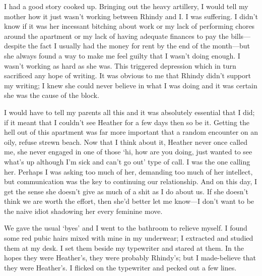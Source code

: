 I had a good story cooked up. Bringing out the heavy artillery, I would
tell my mother how it just wasn't working between Rhindy and I. I was
suffering. I didn't know if it was her incessant bitching about work or
my lack of performing chores around the apartment or my lack of having
adequate finances to pay the bills---despite the fact I usually had the
money for rent by the end of the month---but she always found a way to
make me feel guilty that I wasn't doing enough. I wasn't working as hard
as she was. This triggered depression which in turn sacrificed any hope
of writing. It was obvious to me that Rhindy didn't support my writing;
I knew she could never believe in what I was doing and it was certain
she was the cause of the block.

I would have to tell my parents all this and it was absolutely essential
that I did; if it meant that I couldn't see Heather for a few days then
so be it. Getting the hell out of this apartment was far more important
that a random encounter on an oily, refuse strewn beach. Now that I
think about it, Heather never once called me, she never engaged in one
of those `hi, how are you doing, just wanted to see what's up although
I'm sick and can't go out' type of call. I was the one calling her.
Perhaps I was asking too much of her, demanding too much of her
intellect, but communication was the key to continuing our relationship.
And on this day, I get the sense she doesn't give as much of a shit as I
do about us. If she doesn't think we are worth the effort, then she'd
better let me know---I don't want to be the naive idiot shadowing her
every feminine move.

We gave the usual `byes' and I went to the bathroom to relieve myself. I
found some red pubic hairs mixed with mine in my underwear; I extracted
and studied them at my desk. I set them beside my typewriter and stared
at them. In the hopes they were Heather's, they were probably Rhindy's;
but I made-believe that they were Heather's. I flicked on the typewriter
and pecked out a few lines.

